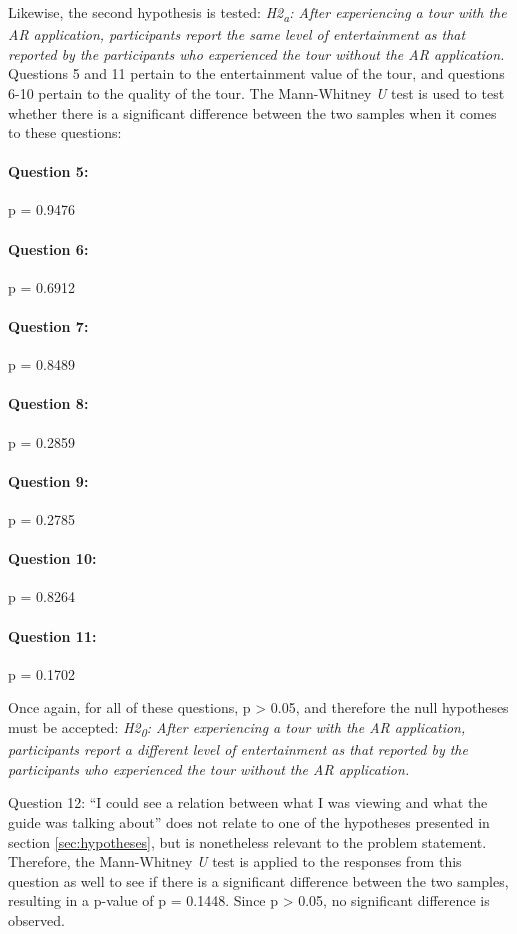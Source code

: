 Likewise, the second hypothesis is tested: \textit{H2\textsubscript{a}: After experiencing a tour with the AR application, participants report the same level of entertainment as that reported by the participants who experienced the tour without the AR application.} Questions 5 and 11 pertain to the entertainment value of the tour, and questions 6-10 pertain to the quality of the tour. The Mann-Whitney \textit{U} test is used to test whether there is a significant difference between the two samples when it comes to these questions:

\paragraph{Question 5:} p = 0.9476
\paragraph{Question 6:} p = 0.6912
\paragraph{Question 7:} p = 0.8489
\paragraph{Question 8:} p = 0.2859
\paragraph{Question 9:} p = 0.2785
\paragraph{Question 10:} p = 0.8264
\paragraph{Question 11:} p = 0.1702

Once again, for all of these questions, p > 0.05, and therefore the null hypotheses must be accepted: \textit{H2\textsubscript{0}: After experiencing a tour with the AR application, participants report a different level of entertainment as that reported by the participants who experienced the tour without the AR application.}

Question 12: “I could see a relation between what I was viewing and what the guide was talking about” does not relate to one of the hypotheses presented in section \ref{sec:hypotheses}, but is nonetheless relevant to the problem statement. Therefore, the Mann-Whitney \textit{U} test is applied to the responses from this question as well to see if there is a significant difference between the two samples, resulting in a p-value of p = 0.1448. Since p > 0.05, no significant difference is observed. 

